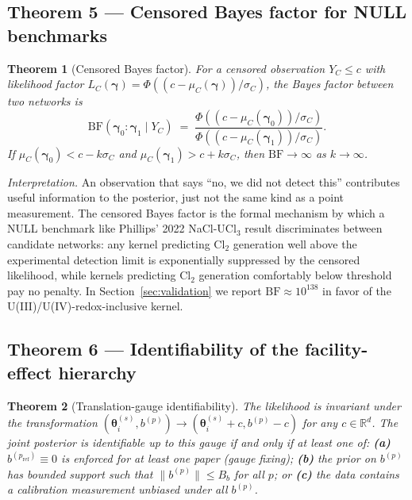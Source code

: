 \documentclass[12pt]{article}
\theoremstyle{plain}
\newtheorem{theorem}{Theorem}
\theoremstyle{definition}
\theoremstyle{remark}
\newcommand{\R}{\mathbb{R}}
\newcommand{\norm}[1]{\lVert #1 \rVert}
\begin{document}
\subsection{Theorem 5 --- Censored Bayes factor for NULL benchmarks}\label{sec:thm5}

\begin{theorem}[Censored Bayes factor]\label{thm:censored}
For a censored observation $Y_C \le c$ with likelihood factor
$L_C(\boldsymbol\gamma) = \Phi((c - \mu_C(\boldsymbol\gamma))/\sigma_C)$,
the Bayes factor between two networks is
\begin{equation}
  \mathrm{BF}(\boldsymbol\gamma_0:\boldsymbol\gamma_1 \mid Y_C)
   \;=\;
   \frac{\Phi((c - \mu_C(\boldsymbol\gamma_0))/\sigma_C)}
        {\Phi((c - \mu_C(\boldsymbol\gamma_1))/\sigma_C)}.
\end{equation}
If $\mu_C(\boldsymbol\gamma_0) < c - k\sigma_C$ and
$\mu_C(\boldsymbol\gamma_1) > c + k\sigma_C$, then
$\mathrm{BF} \to \infty$ as $k\to\infty$.
\end{theorem}

\emph{Interpretation.}  An observation that says ``no, we did not detect
this'' contributes useful information to the posterior, just not the same
kind as a point measurement.  The censored Bayes factor is the formal
mechanism by which a NULL benchmark like Phillips' 2022 \mbox{NaCl-UCl$_3$}
result discriminates between candidate networks:  any kernel predicting
Cl$_2$ generation well above the experimental detection limit is
exponentially suppressed by the censored likelihood, while kernels
predicting Cl$_2$ generation comfortably below threshold pay no penalty.
In Section~\ref{sec:validation} we report $\mathrm{BF} \approx 10^{138}$
in favor of the U(III)/U(IV)-redox-inclusive kernel.

\subsection{Theorem 6 --- Identifiability of the facility-effect hierarchy}\label{sec:thm6}

\begin{theorem}[Translation-gauge identifiability]\label{thm:facility}
The likelihood is invariant under the transformation
$(\boldsymbol\theta_i^{(s)}, b^{(p)}) \to (\boldsymbol\theta_i^{(s)} + c,
b^{(p)} - c)$ for any $c \in \R^d$.  The joint posterior is identifiable
up to this gauge if and only if at least one of:
\textbf{(a)} $b^{(p_{\mathrm{ref}})} \equiv 0$ is enforced for at least one
paper (gauge fixing);
\textbf{(b)} the prior on $b^{(p)}$ has bounded support such that
$\norm{b^{(p)}} \le B_b$ for all $p$;
or \textbf{(c)} the data contains a calibration measurement unbiased under
all $b^{(p)}$.
\end{theorem}
\end{document}
